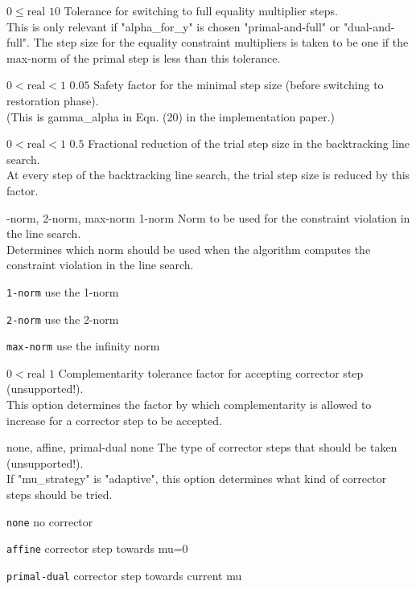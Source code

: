 %
{$0\leq\textrm{real}$}%
{$10$}%
{Tolerance for switching to full equality multiplier steps.\\
This is only relevant if "alpha\_for\_y" is chosen "primal-and-full" or "dual-and-full".  The step size for the equality constraint multipliers is taken to be one if the max-norm of the primal step is less than this tolerance.}%
{}

%
{$0<\textrm{real}<1$}%
{$0.05$}%
{Safety factor for the minimal step size (before switching to restoration phase).\\
(This is gamma\_alpha in Eqn. (20) in the implementation paper.)}%
{}

%
{$0<\textrm{real}<1$}%
{$0.5$}%
{Fractional reduction of the trial step size in the backtracking line search.\\
At every step of the backtracking line search, the trial step size is reduced by this factor.}%
{}

%
{-norm, 2-norm, max-norm}%
{1-norm}%
{Norm to be used for the constraint violation in the line search.\\
Determines which norm should be used when the algorithm computes the constraint violation in the line search.}%
{\begin{list}{}{
\setlength{\parsep}{0em}
\setlength{\leftmargin}{5ex}
\setlength{\labelwidth}{2ex}
\setlength{\itemindent}{0ex}
\setlength{\topsep}{0pt}}
\item[\texttt{1-norm}] use the 1-norm
\item[\texttt{2-norm}] use the 2-norm
\item[\texttt{max-norm}] use the infinity norm
\end{list}
}

%
{$0<\textrm{real}$}%
{$1$}%
{Complementarity tolerance factor for accepting corrector step (unsupported!).\\
This option determines the factor by which complementarity is allowed to increase for a corrector step to be accepted.}%
{}

%
{\ttfamily none, affine, primal-dual}%
{none}%
{The type of corrector steps that should be taken (unsupported!).\\
If "mu\_strategy" is "adaptive", this option determines what kind of corrector steps should be tried.}%
{\begin{list}{}{
\setlength{\parsep}{0em}
\setlength{\leftmargin}{5ex}
\setlength{\labelwidth}{2ex}
\setlength{\itemindent}{0ex}
\setlength{\topsep}{0pt}}
\item[\texttt{none}] no corrector
\item[\texttt{affine}] corrector step towards mu=0
\item[\texttt{primal-dual}] corrector step towards current mu
\end{list}
}

